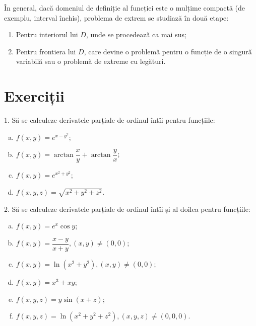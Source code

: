 \begin{remark}\label{rk:int-fr}
  În general, dacă domeniul de definiție al funcției este o mulțime compactă
  (de exemplu, interval închis), problema de extrem se studiază în două etape:
  \begin{enumerate}[(1)]
  \item Pentru interiorul lui $ D $, unde se procedează ca mai sus;
  \item Pentru frontiera lui $ D $, care devine o problemă pentru o funcție
    de o singură variabilă sau o problemă de extreme cu legături.
  \end{enumerate}
\end{remark}


\section{Exerciții}

1. Să se calculeze derivatele parțiale de ordinul întîi pentru funcțiile:
\begin{enumerate}[(a)]
\item $ f(x, y) = e^{x - y^2} $;
\item $ f(x, y) = \arctan \dfrac{x}{y} + \arctan \dfrac{y}{x} $;
\item $ f(x, y) = e^{x^2 + y^2} $;
\item $ f(x, y, z) = \sqrt{x^2  + y^2 + z^2} $.
\end{enumerate}

2. Să se calculeze derivatele parțiale de ordinul întîi și al doilea
pentru funcțiile:
\begin{enumerate}[(a)]
\item $ f(x, y) = e^x \cos y $;
\item $ f(x, y) = \dfrac{x - y}{x + y}, (x, y) \neq (0, 0) $;
\item $ f(x, y) = \ln(x^2 + y^2), (x, y) \neq (0, 0) $;
\item $ f(x, y) = x^3 + xy $;
\item $ f(x, y, z) = y \sin (x + z) $;
\item $ f(x, y, z) = \ln(x^2 + y^2 + z^2), (x, y, z) \neq (0, 0, 0) $.
\end{enumerate}

